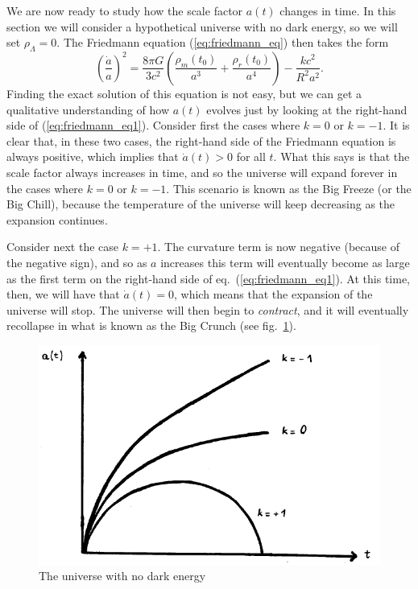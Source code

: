 We are now ready to study how the scale factor $a(t)$ changes in time. In this section we will consider a hypothetical universe with no dark energy, so we will set $\rho_{\Lambda}=0$. The Friedmann equation (\ref{eq:friedmann_eq}) then takes the form
\begin{equation} \label{eq:friedmann_eq1}
\left(\frac{\dot{a}}{a}\right)^2=\frac{8\pi G}{3c^2}\left( \frac{\rho_m(t_0)}{a^3}+\frac{\rho_r(t_0)}{a^4} \right)-\frac{kc^2}{R^2a^2}.
\end{equation}
Finding the exact solution of this equation is not easy, but we can get a qualitative understanding of how $a(t)$ evolves just by looking at the right-hand side of (\ref{eq:friedmann_eq1}). Consider first the cases where $k=0$ or $k=-1$. It is clear that, in these two cases, the right-hand side of the Friedmann equation is always positive, which implies that $\dot{a}(t)>0$ for all $t$. What this says is that the scale factor always increases in time, and so the universe will expand forever in the cases where $k=0$ or $k=-1$. This scenario is known as the Big Freeze (or the Big Chill), because the temperature of the universe will keep decreasing as the expansion continues.

Consider next the case $k=+1$. The curvature term is now negative (because of the negative sign), and so as $a$ increases this term will eventually become as large as the first term on the right-hand side of eq.\ (\ref{eq:friedmann_eq1}). At this time, then, we will have that $\dot{a}(t)=0$, which means that the expansion of the universe will stop. The universe will then begin to {\it contract}, and it will eventually recollapse in what is known as the Big Crunch (see fig.\ \ref{fig:lec6_3}).
\begin{figure}[ht]
\begin{center}
\includegraphics[scale=0.5]{Draw/lec6_3.png}
\end{center}
\caption{The universe with no dark energy}
\label{fig:lec6_3}
\end{figure}

